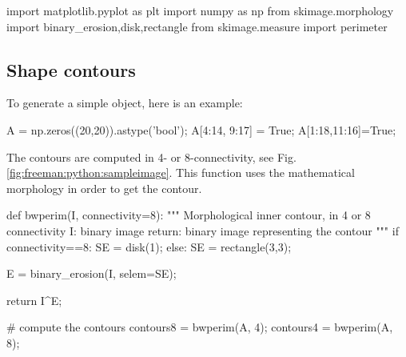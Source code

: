 \def\QRCODE{TB_IPR_TUT.IMG.freeman_pythonqrcode.png}
\def\QRPAGE{http://www.iptutorials.science/tree/master/TB_IPR/TUT.IMG.freeman/python}

\begin{python}
import matplotlib.pyplot as plt
import numpy as np
from skimage.morphology import binary_erosion,disk,rectangle
from skimage.measure import perimeter
\end{python}

\subsection{Shape contours}
To generate a simple object, here is an example:
\begin{python}
A = np.zeros((20,20)).astype('bool');
A[4:14, 9:17] = True;
A[1:18,11:16]=True;
\end{python}


The contours are computed in 4- or 8-connectivity, see Fig.\ref{fig:freeman:python:sampleimage}. This function uses the mathematical morphology in order to get the contour.

\begin{python}
def bwperim(I, connectivity=8):
    """
    Morphological inner contour, in 4 or 8 connectivity
    I: binary image
    return: binary image representing the contour
    """
    if connectivity==8:
        SE = disk(1);
    else:
        SE = rectangle(3,3);
        
    E = binary_erosion(I, selem=SE);
    
    return I^E;
    
# compute the contours
contours8 = bwperim(A, 4);
contours4 = bwperim(A, 8);
\end{python}


